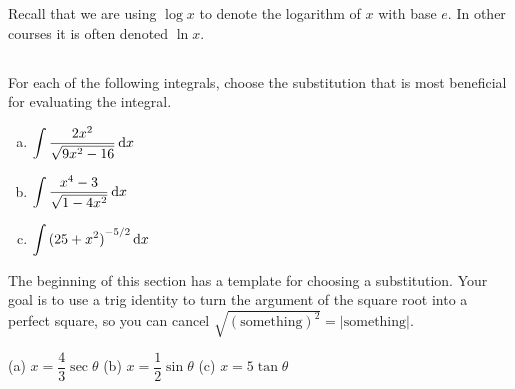 
\noindent 
Recall that we are using $\log x$ to denote the logarithm of $x$ with
base $e$. In other courses it is often denoted $\ln x$.


\subsection*{\Conceptual}



\begin{Mquestion}[2015A]\label{prob:s1.9_1}
For each of the following integrals, choose the substitution that
is most beneficial for evaluating the integral.
\begin{enumerate}[(a)]
\item
$\displaystyle \int \frac{2x^2}{\sqrt{9x^2-16}} \, \mathrm{d}x$ 

\item $\displaystyle \int \frac{x^4-3}{\sqrt{1-4x^2}} \, \mathrm{d}x$ 

\item $\displaystyle \int {(25+x^2)}^{-5/2} \, \mathrm{d}x$
\end{enumerate}


\end{Mquestion}

\begin{hint} 
The beginning of this section has a template for choosing a substitution. Your goal is to use a trig identity to turn the argument of the square root into a perfect square, so you can cancel $\sqrt{(\mbox{something})^2}=|\mbox{something}|$. 
\end{hint}

\begin{answer} 
(a) $x=\dfrac{4}{3}\sec\theta$
\qquad (b) $x=\dfrac{1}{2}\sin\theta$
\qquad (c) $x=5\tan\theta$
\end{answer}

